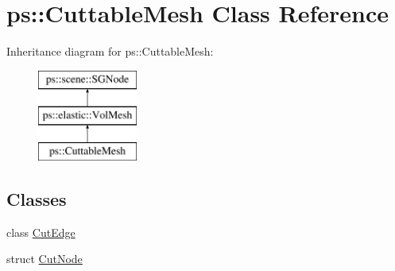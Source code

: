 \hypertarget{classps_1_1CuttableMesh}{}\section{ps\+:\+:Cuttable\+Mesh Class Reference}
\label{classps_1_1CuttableMesh}
Inheritance diagram for ps\+:\+:Cuttable\+Mesh\+:\begin{figure}[H]
\begin{center}
\leavevmode
\includegraphics[height=3.000000cm]{classps_1_1CuttableMesh}
\end{center}
\end{figure}
\subsection*{Classes}
\begin{DoxyCompactItemize}
\item 
class \hyperlink{classps_1_1CuttableMesh_1_1CutEdge}{Cut\+Edge}
\item 
struct \hyperlink{structps_1_1CuttableMesh_1_1CutNode}{Cut\+Node}
\end{DoxyCompactItemize}
